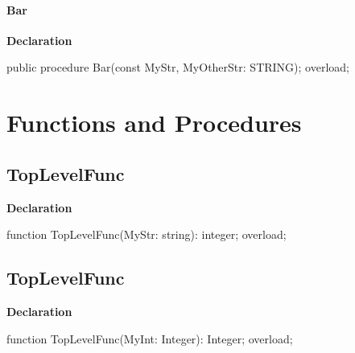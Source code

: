 \documentclass{report}
\begin{document}
\paragraph*{Bar}\hspace*{\fill}

\begin{list}{}{
\setlength{\itemindent}{0cm}
\setlength{\listparindent}{0cm}
\setlength{\leftmargin}{\evensidemargin}
\addtolength{\leftmargin}{\tmplength}
\settowidth{\labelsep}{X}
\addtolength{\leftmargin}{\labelsep}
\setlength{\labelwidth}{\tmplength}
}
\begin{flushleft}
\item[\textbf{Declaration}\hfill]
\begin{ttfamily}
public procedure Bar(const MyStr, MyOtherStr: STRING); overload;\end{ttfamily}


\end{flushleft}
\end{list}
\section{Functions and Procedures}
\subsection*{TopLevelFunc}
\begin{list}{}{
\setlength{\itemindent}{0cm}
\setlength{\listparindent}{0cm}
\setlength{\leftmargin}{\evensidemargin}
\addtolength{\leftmargin}{\tmplength}
\settowidth{\labelsep}{X}
\addtolength{\leftmargin}{\labelsep}
\setlength{\labelwidth}{\tmplength}
}
\begin{flushleft}
\item[\textbf{Declaration}\hfill]
\begin{ttfamily}
function TopLevelFunc(MyStr: string): integer; overload;\end{ttfamily}


\end{flushleft}
\end{list}
\subsection*{TopLevelFunc}
\begin{list}{}{
\setlength{\itemindent}{0cm}
\setlength{\listparindent}{0cm}
\setlength{\leftmargin}{\evensidemargin}
\addtolength{\leftmargin}{\tmplength}
\settowidth{\labelsep}{X}
\addtolength{\leftmargin}{\labelsep}
\setlength{\labelwidth}{\tmplength}
}
\begin{flushleft}
\item[\textbf{Declaration}\hfill]
\begin{ttfamily}
function TopLevelFunc(MyInt: Integer): Integer; overload;\end{ttfamily}


\end{flushleft}
\end{list}
\end{document}
